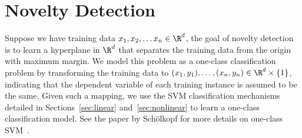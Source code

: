 \section{Novelty Detection}
Suppose we have training data $x_1, x_2, \ldots x_n \in \R^d$, the goal of novelty detection is to learn a hyperplane in $\R^d$ that separates the training data from the origin with maximum margin. We model this problem as a 
one-class classification problem by transforming the training data to $(x_1,y_1),\ldots,(x_n,y_n) \in \R^d\times \{1\}$, indicating that the dependent variable of each training instance is assumed to be the same.
Given such a mapping, we use the SVM classification mechanisms detailed in Sections~\ref{sec:linear} and~\ref{sec:nonlinear} to learn a one-class classification model. See the paper by Sch\"{o}lkopf for more details on one-class 
SVM~\cite{Scholkopf}.







